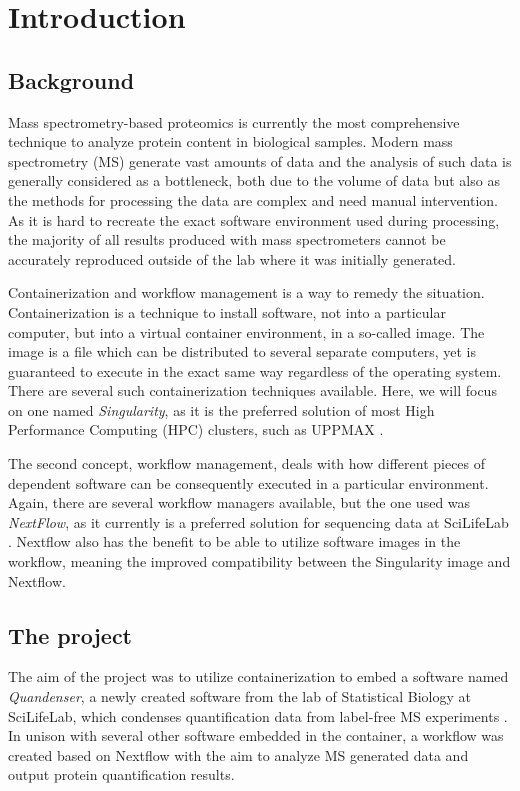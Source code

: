 \section{Introduction}

\subsection{Background}
Mass spectrometry-based proteomics is currently the most comprehensive technique to analyze protein content in biological samples. Modern mass spectrometry (MS) generate vast amounts of data and the analysis of such data is generally considered as a bottleneck, both due to the volume of data but also as the methods for processing the data are complex and need manual intervention. As it is hard to recreate the exact software environment used during processing, the majority of all results produced with mass spectrometers cannot be accurately reproduced outside of the lab where it was initially generated.

Containerization and workflow management is a way to remedy the situation. Containerization is a technique to install software, not into a particular computer, but into a virtual container environment, in a so-called image. The image is a file which can be distributed to several separate computers, yet is guaranteed to execute in the exact same way regardless of the operating system. There are several such containerization techniques available. Here, we will focus on one named \textit{Singularity}, as it is the preferred solution of most High Performance Computing (HPC) clusters, such as UPPMAX \cite{singularity} \cite{singularity-uppmax}.

The second concept, workflow management, deals with how different pieces of dependent software can be consequently executed in a particular environment. Again, there are several workflow managers available, but the one used was \textit{NextFlow}, as it currently is a preferred solution for sequencing data at SciLifeLab \cite{nextflow}. Nextflow also has the benefit to be able to utilize software images in the workflow, meaning the improved compatibility between the Singularity image and Nextflow.

\subsection{The project}
The aim of the project was to utilize containerization to embed a software named \textit{Quandenser}, a newly created software from the lab of Statistical Biology at SciLifeLab, which condenses quantification data from label-free MS experiments \cite{quandenser}. In unison with several other software embedded in the container, a workflow was created based on Nextflow with the aim to analyze MS generated data and output protein quantification results.

